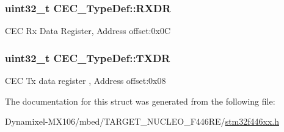 \subsubsection[{\texorpdfstring{R\+X\+DR}{RXDR}}]{ uint32\+\_\+t C\+E\+C\+\_\+\+Type\+Def\+::\+R\+X\+DR}\hypertarget{struct_c_e_c___type_def_ae2bc7566d4fe07776fc8e5b2ace32981}{}\label{struct_c_e_c___type_def_ae2bc7566d4fe07776fc8e5b2ace32981}
C\+EC Rx Data Register, Address offset\+:0x0C 
\subsubsection[{\texorpdfstring{T\+X\+DR}{TXDR}}]{ uint32\+\_\+t C\+E\+C\+\_\+\+Type\+Def\+::\+T\+X\+DR}\hypertarget{struct_c_e_c___type_def_ab8d8a4703a2a87dcd4d1d7b1f38bd464}{}\label{struct_c_e_c___type_def_ab8d8a4703a2a87dcd4d1d7b1f38bd464}
C\+EC Tx data register , Address offset\+:0x08 

The documentation for this struct was generated from the following file\+:\begin{DoxyCompactItemize}
\item 
Dynamixel-\/\+M\+X106/mbed/\+T\+A\+R\+G\+E\+T\+\_\+\+N\+U\+C\+L\+E\+O\+\_\+\+F446\+R\+E/\hyperlink{stm32f446xx_8h}{stm32f446xx.\+h}\end{DoxyCompactItemize}
